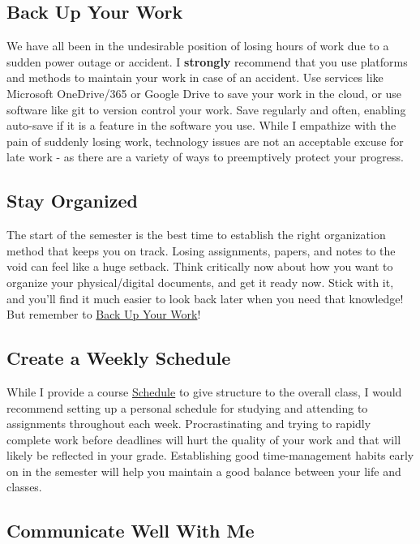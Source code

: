 \documentclass[
  12pt,
  letterpaper,
]{scrartcl}
\begin{document}
\subsection{Back Up Your Work}\label{back-up-your-work}

We have all been in the undesirable position of losing hours of work due
to a sudden power outage or accident. I \textbf{strongly} recommend that
you use platforms and methods to maintain your work in case of an
accident. Use services like Microsoft OneDrive/365 or Google Drive to
save your work in the cloud, or use software like git to version control
your work. Save regularly and often, enabling auto-save if it is a
feature in the software you use. While I empathize with the pain of
suddenly losing work, technology issues are not an acceptable excuse for
late work - as there are a variety of ways to preemptively protect your
progress.

\subsection{Stay Organized}\label{stay-organized}

The start of the semester is the best time to establish the right
organization method that keeps you on track. Losing assignments, papers,
and notes to the void can feel like a huge setback. Think critically now
about how you want to organize your physical/digital documents, and get
it ready now. Stick with it, and you'll find it much easier to look back
later when you need that knowledge! But remember to
\hyperref[back-up-your-work]{Back Up Your Work}!

\subsection{Create a Weekly Schedule}\label{create-a-weekly-schedule}

While I provide a course \hyperref[schedule]{Schedule} to give structure
to the overall class, I would recommend setting up a personal schedule
for studying and attending to assignments throughout each week.
Procrastinating and trying to rapidly complete work before deadlines
will hurt the quality of your work and that will likely be reflected in
your grade. Establishing good time-management habits early on in the
semester will help you maintain a good balance between your life and
classes.

\subsection{Communicate Well With Me}\label{communicate-well-with-me}
\end{document}
